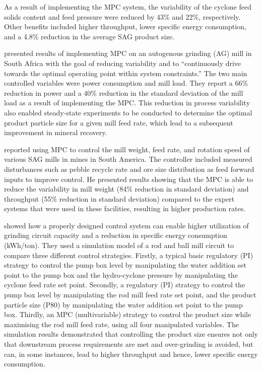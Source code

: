 As a result of implementing the MPC system, the variability of the cyclone feed solids content and feed pressure were reduced by 43\% and 22\%, respectively. Other benefits included higher throughput, lower specific energy consumption, and a 4.8\% reduction in the average \gls{SAG} product size.

\cite{steyn_benefits_2013} presented results of implementing MPC on an autogenous grinding (AG) mill in South Africa with the goal of reducing variability and to ``continuously drive towards the optimal operating point within system constraints.'' The two main controlled variables were power consumption and mill load. They report a 66\% reduction in power and a 40\% reduction in the standard deviation of the mill load as a result of implementing the MPC. This reduction in process variability also enabled steady-state experiments to be conducted to determine the optimal product particle size for a given mill feed rate, which lead to a subsequent improvement in mineral recovery.

\cite{gough_sag_2015} reported using MPC to control the mill weight, feed rate, and rotation speed of various \gls{SAG} mills in mines in South America. The controller included measured disturbances such as pebble recycle rate and ore size distribution as feed forward inputs to improve control. He presented results showing that the MPC is able to reduce the variability in mill weight (84\% reduction in standard deviation) and throughput (55\% reduction in standard deviation) compared to the expert systems that were used in these facilities, resulting in higher production rates.

\cite{bouchard_reducing_2017} showed how a properly designed control system can enable higher utilization of grinding circuit capacity and a reduction in specific energy consumption (kWh/ton). They used a simulation model of a rod and ball mill circuit to compare three different control strategies. Firstly, a typical basic regulatory (PI) strategy to control the pump box level by manipulating the water addition set point to the pump box and the hydro-cyclone pressure by manipulating the cyclone feed rate set point. Secondly, a regulatory (PI) strategy to control the pump box level by manipulating the rod mill feed rate set point, and the product particle size (P80) by manipulating the water addition set point to the pump box. Thirdly, an MPC (multivariable) strategy to control the product size while maximising the rod mill feed rate, using all four manipulated variables. The simulation results demonstrated that controlling the product size ensures not only that downstream process requirements are met and over-grinding is avoided, but can, in some instances, lead to higher throughput and hence, lower specific energy consumption.

